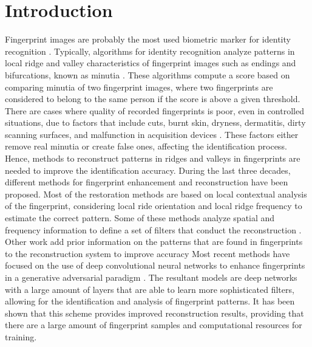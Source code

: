 \documentclass[a4paper,fleqn]{cas-dc}
\begin{document}
\section{Introduction}
Fingerprint images are probably the most used  biometric marker for identity recognition \cite{HFPR}. Typically, algorithms for identity recognition analyze patterns in local ridge and valley characteristics of fingerprint images such as endings and bifurcations, known as minutia \cite{HFPR}. These algorithms compute a score based on comparing minutia of two fingerprint images, where two fingerprints are considered to belong to the same person if the score is above a given threshold. There are cases where quality of recorded fingerprints is poor, even in controlled situations, due to factors that include cuts, burnt skin, dryness, dermatitis, dirty scanning surfaces, and malfunction in acquisition devices \cite{HFPR,FIESDD,CCGAN,AIFEGF,OFFIE}. These factors either remove real minutia or create false ones, affecting the identification process. Hence, methods to reconstruct patterns in ridges and valleys in fingerprints are needed to improve the identification accuracy. During the last three decades, different methods for fingerprint enhancement and reconstruction have been proposed. Most of the restoration methods are based on local contextual analysis of the fingerprint, considering local ride orientation and local ridge frequency to estimate the correct pattern. Some of these methods analyze spatial  and frequency information to define a set of filters that conduct the reconstruction \cite{chikkerur2005fingerprint,fronthaler2007pyramid,turroni2012fingerprint,SIFE}. Other work add prior information on the patterns that are found in fingerprints to the reconstruction system to improve accuracy \cite{feng2010fingerprint,cao2014learning}   Most recent methods have focused on the use of deep convolutional neural networks to enhance fingerprints in a generative adversarial paradigm \cite{ITITAN,CCGAN,dabouei2018id,svoboda2017generative}. The resultant models are deep networks with a large amount of layers that are able to learn more sophisticated filters, allowing for the identification and analysis of fingerprint patterns. It has been shown that this scheme provides improved reconstruction results, providing that there are a large amount of fingerprint samples and computational resources for training. 
\end{document}
